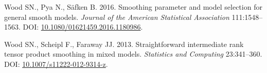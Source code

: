 \documentclass[12pt]{article}
\begin{document}
\hypertarget{ref-wood_smoothing_2016}{}
Wood SN., Pya N., Säfken B. 2016. Smoothing parameter and model
selection for general smooth models. \emph{Journal of the American
Statistical Association} 111:1548--1563. DOI:
\href{https://doi.org/10.1080/01621459.2016.1180986}{10.1080/01621459.2016.1180986}.

\hypertarget{ref-wood_straightforward_2012}{}
Wood SN., Scheipl F., Faraway JJ. 2013. Straightforward intermediate
rank tensor product smoothing in mixed models. \emph{Statistics and
Computing} 23:341--360. DOI:
\href{https://doi.org/10.1007/s11222-012-9314-z}{10.1007/s11222-012-9314-z}.
\end{document}

